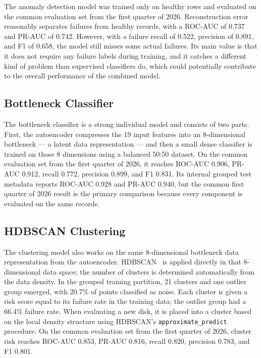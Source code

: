 \documentclass[sigconf,natbib=false]{acmart}
\begin{document}
The anomaly detection model was trained only on healthy rows and evaluated on the common evaluation set from the first quarter of 2026. Reconstruction error reasonably separates failures from healthy records, with a ROC-AUC of 0.737 and PR-AUC of 0.742. However, with a failure recall of 0.522, precision of 0.891, and F1 of 0.658, the model still misses some actual failures. Its main value is that it does not require any failure labels during training, and it catches a different kind of problem than supervised classifiers do, which could potentially contribute to the overall performance of the combined model.

\subsection{Bottleneck Classifier}

The bottleneck classifier is a strong individual model and consists of two parts. First, the autoencoder compresses the 19 input features into an 8-dimensional bottleneck — a latent data representation — and then a small dense classifier is trained on those 8 dimensions using a balanced 50:50 dataset. On the common evaluation set from the first quarter of 2026, it reaches ROC-AUC 0.906, PR-AUC 0.912, recall 0.772, precision 0.899, and F1 0.831. Its internal grouped test metadata reports ROC-AUC 0.928 and PR-AUC 0.940, but the common first quarter of 2026 result is the primary comparison because every component is evaluated on the same records.

\subsection{HDBSCAN Clustering}

The clustering model also works on the same 8-dimensional bottleneck data representation from the autoencoder. HDBSCAN~\cite{campello2013hdbscan,mcinnes2017hdbscan} is applied directly in that 8-dimensional data space; the number of clusters is determined automatically from the data density. In the grouped training partition, 21 clusters and one outlier group emerged, with 20.7\% of points classified as noise. Each cluster is given a risk score equal to its failure rate in the training data; the outlier group had a 66.4\% failure rate. When evaluating a new disk, it is placed into a cluster based on the local density structure using HDBSCAN's \texttt{approximate\_predict} procedure. On the common evaluation set from the first quarter of 2026, cluster risk reaches ROC-AUC 0.853, PR-AUC 0.816, recall 0.820, precision 0.783, and F1 0.801.
\end{document}
